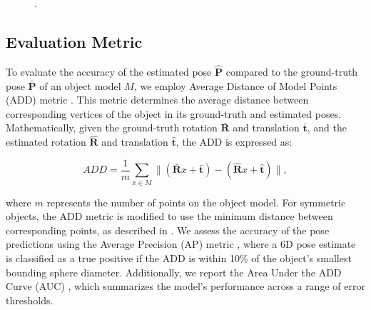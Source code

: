 \begin{figure}[!ht]
\DIFdelendFL \caption{\DIFdelbeginFL {}\DIFdelendFL \DIFaddbeginFL {}\DIFaddendFL .\DIFdelbeginFL {}\DIFdelendFL }
    \DIFdelbeginFL %
{%
}
\DIFdelendFL \label{fig:result2}
\end{figure}

\subsection{Evaluation Metric}
\label{sec:metric}

To evaluate the accuracy of the estimated pose \(\mathbf{\hat{P}}\) compared to the ground-truth pose \(\mathbf{\bar{P}}\) of an object model \(M\), we employ Average Distance of Model Points (ADD) metric \cite{hinterstoisser2012model}. This metric determines the average distance between corresponding vertices of the object in its ground-truth and estimated poses. Mathematically, given the ground-truth rotation \(\mathbf{\bar{R}}\) and translation \(\mathbf{\bar{t}}\), and the estimated rotation \(\mathbf{\hat{R}}\) and translation \(\mathbf{\hat{t}}\), the ADD is expressed as:

\begin{equation}
ADD = \frac{1}{m} \sum_{x \in M} \parallel (\mathbf{\bar{R}}x + \mathbf{\bar{t}}) - (\mathbf{\hat{R}}x + \mathbf{\hat{t}}) \parallel,
\end{equation}

\noindent where \(m\) represents the number of points on the object model. For symmetric objects, the ADD metric is modified to use the minimum distance between corresponding points, as described in \cite{bregier2017symmetry}. We assess the accuracy of the pose predictions using the Average Precision (AP) metric \cite{bregier2017symmetry}, where a 6D pose estimate is classified as a true positive if the ADD is within 10\% of the object's smallest bounding sphere diameter. Additionally, we report the Area Under the ADD Curve (AUC) \cite{wang2019densefusion}, which summarizes the model's performance across a range of error thresholds.

